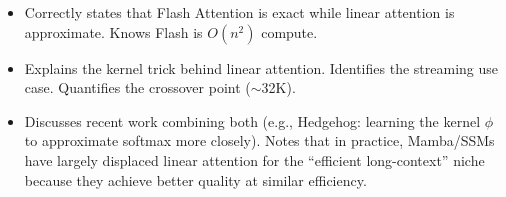 \begin{interviewq}

\goodgreat
\begin{itemize}
    \item {} Correctly states that Flash Attention is exact while linear attention is approximate. Knows Flash is $O(n^2)$ compute.
    \item {} Explains the kernel trick behind linear attention. Identifies the streaming use case. Quantifies the crossover point ($\sim$32K).
    \item {} Discusses recent work combining both (e.g., Hedgehog: learning the kernel $\phi$ to approximate softmax more closely). Notes that in practice, Mamba/SSMs have largely displaced linear attention for the ``efficient long-context'' niche because they achieve better quality at similar efficiency.
\end{itemize}

\end{interviewq}
